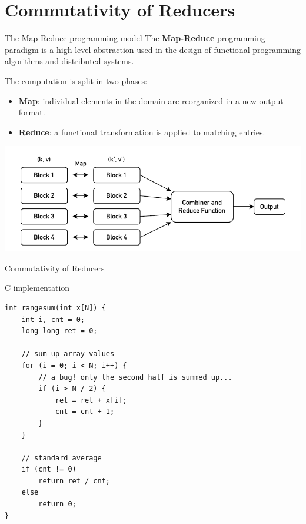 \documentclass[aspectratio=1610,10.5pt]{beamer} %
\begin{document}
\section{Commutativity of Reducers}

\begin{frame}{The Map-Reduce programming model}
    The \textbf{Map-Reduce} programming paradigm is a high-level abstraction used in the design of functional programming algorithms and distributed systems.

    \bigskip

    The computation is split in two phases:
    \begin{itemize}
        \item \textbf{Map}: individual elements in the domain are reorganized in a new output format.

        \item \textbf{Reduce}: a functional transformation is applied to matching entries.
    \end{itemize}

    \begin{center}
        \includegraphics[height=%
        0.55\textheight]{../res/map-reduce}
    \end{center}
\end{frame}

\begin{frame}[fragile]{Commutativity of Reducers}
    \begin{block}{C implementation}
            \begin{verbatim}
int rangesum(int x[N]) {
    int i, cnt = 0;
    long long ret = 0;

    // sum up array values
    for (i = 0; i < N; i++) {
        // a bug! only the second half is summed up...
        if (i > N / 2) {
            ret = ret + x[i];
            cnt = cnt + 1;
        }
    }

    // standard average
    if (cnt != 0)
        return ret / cnt;
    else
        return 0;
}
            \end{verbatim}
    \end{block}
\end{frame}
\end{document}
